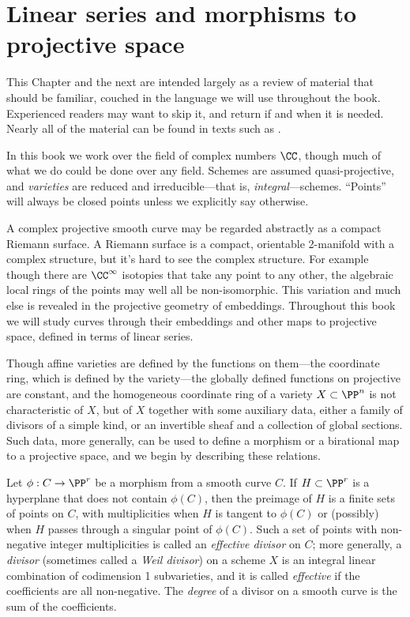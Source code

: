 

\chapter{Linear series and morphisms to projective space}\label{linear series}

This Chapter and the next are intended largely as a review of material that should be familiar, couched in the language we will use throughout the book. Experienced readers 
may want to skip it, and return if and when it is needed. Nearly all of the material can be found in texts such as \cite{H}.


In this book we work over the field of complex numbers $\CC$, though much of what we do
could be done over any field. 
Schemes are assumed quasi-projective, and \emph{varieties} are reduced and irreducible---that is, \emph{integral}---schemes. ``Points'' will always be closed points unless we explicitly say otherwise.

A complex projective smooth curve may  be regarded abstractly as a compact Riemann surface. A Riemann surface is a compact, orientable 2-manifold with a complex structure, but it's hard to see the complex structure. For example though there
are $\CC^\infty$ isotopies that take any point to any other, the algebraic local rings of the points may well all be non-isomorphic. This variation and much else is revealed in the projective geometry of embeddings. Throughout this book we will study curves through their embeddings and other maps to projective space, defined in terms of linear series. 

Though affine varieties are defined by the functions on them---the coordinate ring, which is defined by the variety---the globally defined functions on projective are constant, and
the homogeneous coordinate ring of a variety $X\subset \PP^n$ is not characteristic of $X$, but of $X$ together with some auxiliary data, 
either a family of divisors of a simple kind, or an invertible sheaf and a collection of global sections. Such data, more generally, can be used to define a morphism or a birational map
to a projective space, and we begin by describing these relations.

Let $\phi: C\to \PP^{r}$ be a morphism from a smooth curve $C$. If $H\subset \PP^r$ is a hyperplane that does not contain $\phi(C)$, then the preimage of $H$ is a finite sets of points on $C$, with multiplicities when $H$ is tangent to $\phi(C)$ or (possibly) when $H$ passes through a singular point of $\phi(C)$. Such a set of points with non-negative integer multiplicities is called an \emph{effective divisor} on $C$; more generally, a \emph{divisor} (sometimes called a \emph{Weil divisor}) on a scheme $X$ is an integral linear combination of codimension 1 subvarieties, and it is called \emph{effective} if the coefficients are all non-negative. The \emph{degree} of a divisor on a smooth curve
is the sum of the coefficients. 

